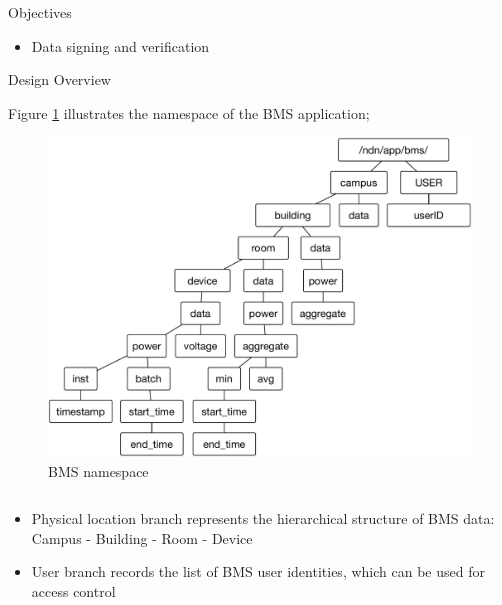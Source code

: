 \documentclass[final,hyperref={pdfpagelabels=false},20pt]{beamer}
\begin{document}
\begin{frame}[t]
\begin{columns}[t]
\begin{column}{.465\textwidth}
\begin{block}{Objectives}
\begin{itemize}
\begin{itemize}
Design a hierarchical storage approach and a stream-based approach to calculating aggregates, distributing processing and taking advantage of local storage.
\item{Data signing and verification}
\end{itemize}
\end{itemize}


\end{block}


\begin{block}{Design Overview}

Figure \ref{fig:namespace} illustrates the namespace of the BMS application;

\begin{figure}
\includegraphics[width=0.9\linewidth]{bms-namespace-update-Sep19}
\caption{BMS namespace}
\label{fig:namespace}
\end{figure}

\begin{columns}[T]

\begin{column}{.42\textwidth}
\begin{itemize}
\item{Physical location branch represents the hierarchical structure of BMS data: Campus - Building - Room - Device}
\item{User branch records the list of BMS user identities, which can be used for access control}
\end{itemize}
\end{column}


\end{columns}
\end{block}
\end{column}
\end{columns}
\end{frame}
\end{document}
